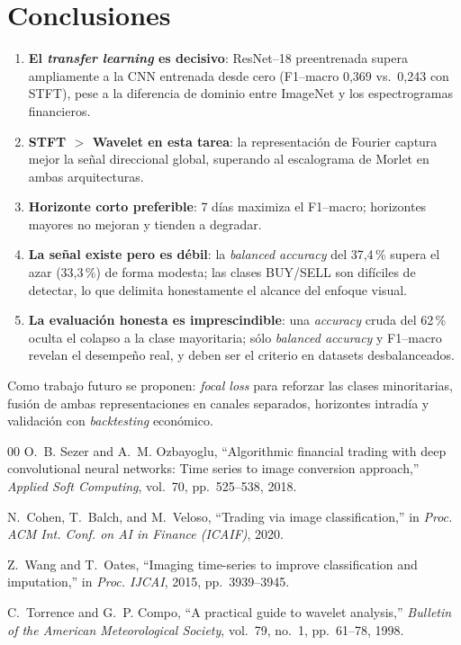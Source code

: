 \documentclass[conference]{IEEEtran}
\begin{document}
\section{Conclusiones}
\begin{enumerate}
  \item \textbf{El \emph{transfer learning} es decisivo}: ResNet--18
        preentrenada supera ampliamente a la CNN entrenada desde cero
        (F1--macro 0,369 vs.\ 0,243 con STFT), pese a la diferencia de
        dominio entre ImageNet y los espectrogramas financieros.
  \item \textbf{STFT $>$ Wavelet en esta tarea}: la representación de Fourier
        captura mejor la señal direccional global, superando al escalograma
        de Morlet en ambas arquitecturas.
  \item \textbf{Horizonte corto preferible}: 7 días maximiza el F1--macro;
        horizontes mayores no mejoran y tienden a degradar.
  \item \textbf{La señal existe pero es débil}: la \emph{balanced accuracy}
        del 37,4\,\% supera el azar (33,3\,\%) de forma modesta; las clases
        BUY/SELL son difíciles de detectar, lo que delimita honestamente el
        alcance del enfoque visual.
  \item \textbf{La evaluación honesta es imprescindible}: una
        \emph{accuracy} cruda del 62\,\% oculta el colapso a la clase
        mayoritaria; sólo \emph{balanced accuracy} y F1--macro revelan el
        desempeño real, y deben ser el criterio en datasets desbalanceados.
\end{enumerate}

Como trabajo futuro se proponen: \emph{focal loss} para reforzar las clases
minoritarias, fusión de ambas representaciones en canales separados,
horizontes intradía y validación con \emph{backtesting} económico.

\begin{thebibliography}{00}
 O.~B. Sezer and A.~M. Ozbayoglu, ``Algorithmic financial
trading with deep convolutional neural networks: Time series to image
conversion approach,'' \emph{Applied Soft Computing}, vol.~70,
pp.~525--538, 2018.

 N.~Cohen, T.~Balch, and M.~Veloso, ``Trading via image
classification,'' in \emph{Proc. ACM Int. Conf. on AI in Finance (ICAIF)},
2020.

 Z.~Wang and T.~Oates, ``Imaging time-series to improve
classification and imputation,'' in \emph{Proc. IJCAI}, 2015,
pp.~3939--3945.

 C.~Torrence and G.~P. Compo, ``A practical guide to
wavelet analysis,'' \emph{Bulletin of the American Meteorological Society},
vol.~79, no.~1, pp.~61--78, 1998.
\end{thebibliography}
\end{document}
